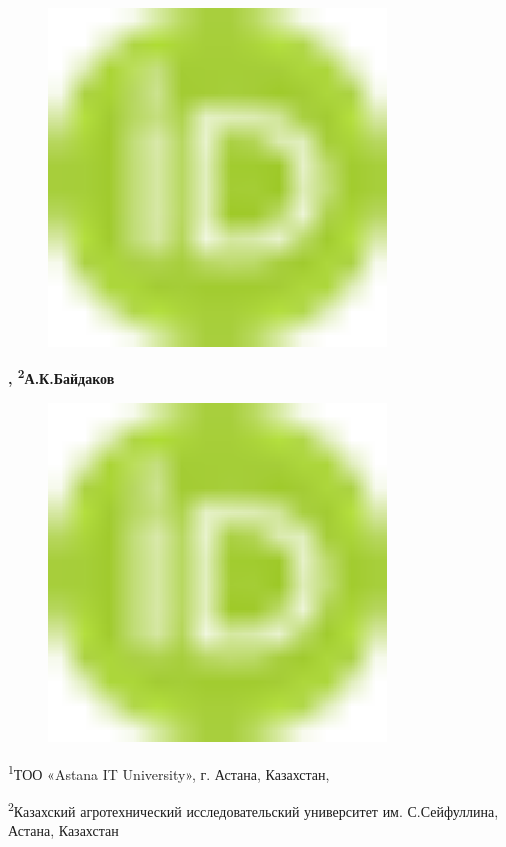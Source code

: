 \begin{figure}[H]
	\centering
	\includegraphics[width=0.8\textwidth]{media/ekon2/image1}
	\caption*{}
\end{figure}
 {\bfseries ,
\textsuperscript{2}А.К.Байдаков}
\begin{figure}[H]
	\centering
	\includegraphics[width=0.8\textwidth]{media/ekon2/image1}
	\caption*{}
\end{figure}


\textsuperscript{1}ТОО «Astana IT University», г. Астана, Казахстан,

\textsuperscript{2}Казахский агротехнический исследовательский
университет им. С.Сейфуллина, Астана, Казахстан


